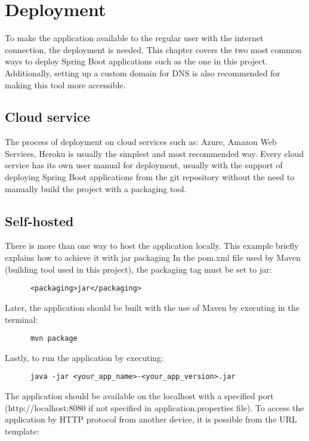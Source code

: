 \section{Deployment}
  To make the application available to the regular user with the internet connection, the deployment is needed. This chapter covers the two most common ways to deploy Spring Boot applications such as the one in this project. Additionally, setting up a custom domain for DNS is also recommended for making this tool more accessible.

  \subsection{Cloud service}
    The process of deployment on cloud services such as: Azure, Amazon Web Services, Heroku is usually the simplest and most recommended way. Every cloud service has its own user manual for deployment, usually with the support of deploying Spring Boot applications from the git repository without the need to manually build the project with a packaging tool.

  \subsection{Self-hosted}
    There is more than one way to host the application locally. This example briefly explains how to achieve it with jar packaging
    In the pom.xml file used by Maven (building tool used in this project), the packaging tag must be set to jar:

    \begin{verbatim}
      <packaging>jar</packaging>
    \end{verbatim}

    Later, the application should be built with the use of Maven by executing in the terminal:
    \begin{verbatim}
      mvn package
    \end{verbatim}

    Lastly, to run the application by executing:
    \begin{verbatim}
      java -jar <your_app_name>-<your_app_version>.jar
    \end{verbatim}

    The application should be available on the localhost with a specified port (http://localhost:8080 if not specified in application.properties file). To access the application by HTTP protocol from another device, it is possible from the URL template:

